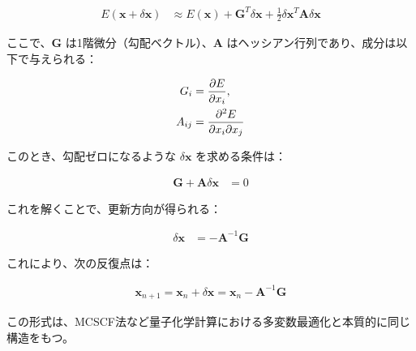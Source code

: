 \documentclass{article}
\begin{document}
\begin{align*}
  E(\bm{x} + \delta \bm{x}) &\approx E(\bm{x}) + \bm{G}^T \delta \bm{x} + \frac{1}{2} \delta \bm{x}^T \bm{A} \delta \bm{x}
\end{align*}

ここで、$\bm{G}$ は1階微分（勾配ベクトル）、$\bm{A}$ はヘッシアン行列であり、成分は以下で与えられる：

\begin{align*}
  G_i &= \pdv{E}{x_i}, \\
  A_{ij} &= \pdv[2]{E}{x_i}{x_j}
\end{align*}

このとき、勾配ゼロになるような $\delta \bm{x}$ を求める条件は：

\begin{align*}
  \bm{G} + \bm{A} \delta \bm{x} &= 0
\end{align*}

これを解くことで、更新方向が得られる：

\begin{align*}
  \delta \bm{x} &= -\bm{A}^{-1} \bm{G}
\end{align*}

これにより、次の反復点は：

\begin{align*}
  \bm{x}_{n+1} = \bm{x}_n + \delta \bm{x} = \bm{x}_n - \bm{A}^{-1} \bm{G}
\end{align*}

この形式は、MCSCF法など量子化学計算における多変数最適化と本質的に同じ構造をもつ。
\end{document}
